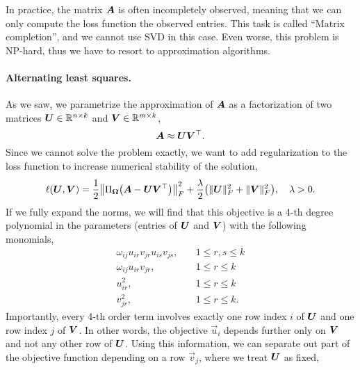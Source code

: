 In practice, the matrix $\bm{A}$ is often incompletely observed, meaning that we can only compute
the loss function \wrt the observed entries. This task is called ``Matrix completion'', and we
cannot use SVD in this case. Even worse, this problem is NP-hard, thus we have to resort to
approximation algorithms.

\paragraph{Alternating least squares.}

As we saw, we parametrize the approximation of $\bm{A}$ as a factorization of two matrices
$\bm{U} \in \mathbb{R}^{n \times k}$ and $\bm{V} \in \mathbb{R}^{m \times k}$, \[
    \bm{A} \approx \bm{U} \bm{V}^\top.
\]
Since we cannot solve the problem exactly, we want to add regularization to the loss function to
increase numerical stability of the solution, \[
    \ell(\mat{U}, \mat{V}) = \frac{1}{2} \lft\| \Pi_{\mat{\Omega}}\lft( \mat{A} - \mat{U} \transpose{\mat{V}} \rgt) \rgt\|^2_F + \frac{\lambda}{2} \lft( \| \mat{U} \|_F^2 + \| \mat{V} \|_F^2 \rgt), \quad \lambda > 0.
\]
If we fully expand the norms, we will find that this objective is a 4-th degree polynomial in the
parameters (entries of $\bm{U}$ and $\bm{V}$) with the following monomials,
\begin{align*}
    \omega_{ij} u_{ir} v_{jr} u_{is} v_{js}, & \quad 1 \leq r, s \leq k \\
    \omega_{ij} u_{ir} v_{jr},               & \quad 1 \leq r \leq k    \\
    u_{ir}^2,                                & \quad 1 \leq r \leq k    \\
    v_{jr}^2,                                & \quad 1 \leq r \leq k.
\end{align*}
Importantly, every 4-th order term involves exactly one row index $i$ of $\bm{U}$ and one row index
$j$ of $\bm{V}$. In other words, the objective \wrt $\vec{u}_i$ depends further only on $\bm{V}$ and not any
other row of $\bm{U}$. Using this information, we can separate out part of the objective
function depending on a row $\vec{v}_j$, where we treat $\bm{U}$ as fixed,

